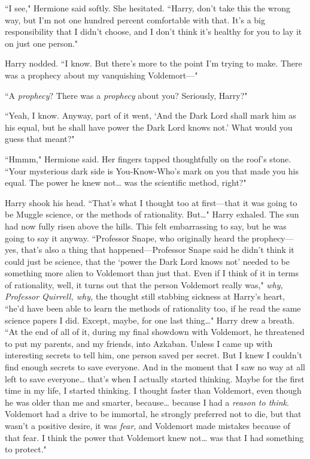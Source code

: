 ``I see," Hermione said softly. She hesitated. ``Harry, don't take this the wrong way, but I'm not one hundred percent comfortable with that. It's a big responsibility that I didn't choose, and I don't think it's healthy for you to lay it on just one person."

Harry nodded. ``I know. But there's more to the point I'm trying to make. There was a prophecy about my vanquishing Voldemort---"

``A \emph{prophecy}? There was a \emph{prophecy} about you? Seriously, Harry?"

``Yeah, I know. Anyway, part of it went, `And the Dark Lord shall mark him as his equal, but he shall have power the Dark Lord knows not.' What would you guess that meant?"

``Hmmm," Hermione said. Her fingers tapped thoughtfully on the roof's stone. ``Your mysterious dark side is You-Know-Who's mark on you that made you his equal. The power he knew not{\ldots} was the scientific method, right?"

Harry shook his head. ``That's what I thought too at first---that it was going to be Muggle science, or the methods of rationality. But{\ldots}" Harry exhaled. The sun had now fully risen above the hills. This felt embarrassing to say, but he was going to say it anyway. ``Professor Snape, who originally heard the prophecy---yes, that's also a thing that happened---Professor Snape said he didn't think it could just be science, that the `power the Dark Lord knows not' needed to be something more alien to Voldemort than just that. Even if I think of it in terms of rationality, well, it turns out that the person Voldemort really was," \emph{why, Professor Quirrell, why,} the thought still stabbing sickness at Harry's heart, ``he'd have been able to learn the methods of rationality too, if he read the same science papers I did. Except, maybe, for one last thing{\ldots}" Harry drew a breath. ``At the end of all of it, during my final showdown with Voldemort, he threatened to put my parents, and my friends, into Azkaban. Unless I came up with interesting secrets to tell him, one person saved per secret. But I knew I couldn't find enough secrets to save everyone. And in the moment that I saw no way at all left to save everyone{\ldots} that's when I actually started thinking. Maybe for the first time in my life, I started thinking. I thought faster than Voldemort, even though he was older than me and smarter, because{\ldots} because I had a \emph{reason to think}. Voldemort had a drive to be immortal, he strongly preferred not to die, but that wasn't a positive desire, it was \emph{fear}, and Voldemort made mistakes because of that fear. I think the power that Voldemort knew not{\ldots} was that I had something to protect."

